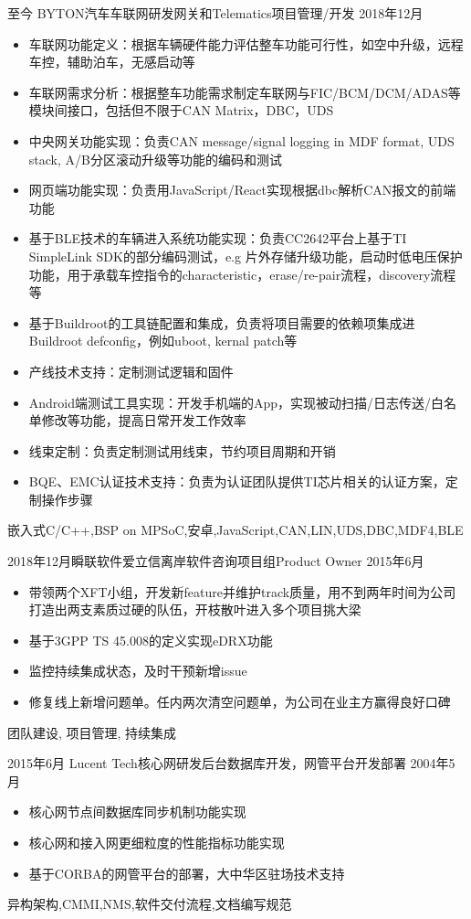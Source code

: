 %
%


 
\begin{experiences}
	
	\experience
	{至今} {BYTON汽车}{车联网研发}{网关和Telematics项目管理/开发}
	{2018年12月 }    {
		\begin{itemize}
			\item 车联网功能定义：根据车辆硬件能力评估整车功能可行性，如空中升级，远程车控，辅助泊车，无感启动等
			\item 车联网需求分析：根据整车功能需求制定车联网与FIC/BCM/DCM/ADAS等模块间接口，包括但不限于CAN Matrix，DBC，UDS
			\item 中央网关功能实现：负责CAN message/signal logging in MDF format, UDS stack, A/B分区滚动升级等功能的编码和测试
			\item 网页端功能实现：负责用JavaScript/React实现根据dbc解析CAN报文的前端功能
			\item 基于BLE技术的车辆进入系统功能实现：负责CC2642平台上基于TI SimpleLink SDK的部分编码测试，e.g 片外存储升级功能，启动时低电压保护功能，用于承载车控指令的characteristic，erase/re-pair流程，discovery流程等
			\item 基于Buildroot的工具链配置和集成，负责将项目需要的依赖项集成进Buildroot defconfig，例如uboot, kernal patch等
			\item 产线技术支持：定制测试逻辑和固件
			\item Android端测试工具实现：开发手机端的App，实现被动扫描/日志传送/白名单修改等功能，提高日常开发工作效率
			\item 线束定制：负责定制测试用线束，节约项目周期和开销
			\item BQE、EMC认证技术支持：负责为认证团队提供TI芯片相关的认证方案，定制操作步骤
		\end{itemize}
	}
	{嵌入式C/C++,BSP on MPSoC,安卓,JavaScript,CAN,LIN,UDS,DBC,MDF4,BLE}
	
	\emptySeparator	
	\experience
	{2018年12月}{瞬联软件}{爱立信离岸软件咨询项目组}{Product Owner}
	{2015年6月} {
		\begin{itemize}
            \item 带领两个XFT小组，开发新feature并维护track质量，用不到两年时间为公司打造出两支素质过硬的队伍，开枝散叶进入多个项目挑大梁
			\item 基于3GPP TS 45.008的定义实现eDRX功能
			\item 监控持续集成状态，及时干预新增issue
			\item 修复线上新增问题单。任内两次清空问题单，为公司在业主方赢得良好口碑
		\end{itemize}
	}
	{团队建设, 项目管理, 持续集成}
		
	\emptySeparator
	\experience
	{2015年6月} {Lucent Tech}{核心网研发}{后台数据库开发，网管平台开发部署}
	{2004年5月}    {
		\begin{itemize}
			\item 核心网节点间数据库同步机制功能实现
			\item 核心网和接入网更细粒度的性能指标功能实现
			\item 基于CORBA的网管平台的部署，大中华区驻场技术支持
		\end{itemize}
	}
	{异构架构,CMMI,NMS,软件交付流程,文档编写规范} 
	\emptySeparator
\end{experiences}
